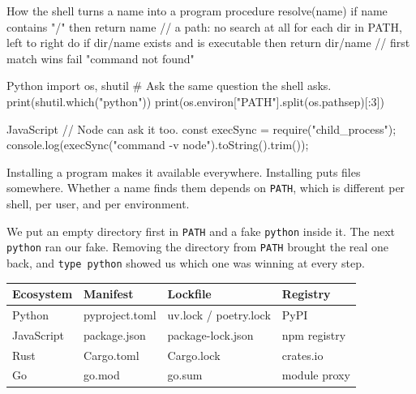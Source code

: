 \begin{algo}{How the shell turns a name into a program}
procedure resolve(name)
  if name contains "/" then return name     // a path: no search at all
  for each dir in PATH, left to right do
    if dir/name exists and is executable then
      return dir/name                        // first match wins
  fail "command not found"
\end{algo}


\begin{code}{Python}
import os, shutil
# Ask the same question the shell asks.
print(shutil.which("python"))
print(os.environ["PATH"].split(os.pathsep)[:3])
\end{code}

\begin{code}{JavaScript}
// Node can ask it too.
const { execSync } = require("child_process");
console.log(execSync("command -v node").toString().trim());
\end{code}


\begin{myth}{Installing a program makes it available everywhere.}
Installing puts files somewhere. Whether a name finds them depends on \texttt{PATH}, which is
different per shell, per user, and per environment.
\end{myth}

\begin{breakage}
We put an empty directory first in \texttt{PATH} and a fake \texttt{python} inside it. The
next \texttt{python} ran our fake. Removing the directory from \texttt{PATH} brought the real
one back, and \texttt{type python} showed us which one was winning at every step.
\end{breakage}


\begin{fullwidth}
\centering
\begin{tabular}{@{}llll@{}}
\toprule
\textbf{Ecosystem} & \textbf{Manifest} & \textbf{Lockfile} & \textbf{Registry} \\
\midrule
Python & pyproject.toml & uv.lock / poetry.lock & PyPI \\
JavaScript & package.json & package-lock.json & npm registry \\
Rust & Cargo.toml & Cargo.lock & crates.io \\
Go & go.mod & go.sum & module proxy \\
\bottomrule
\end{tabular}
\end{fullwidth}

